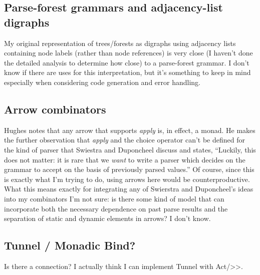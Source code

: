 \documentclass[12pt]{article}
\begin{document}
\subsection{Parse-forest grammars and adjacency-list digraphs}
\label{sec:parse-forest_grammars_adjacency-list_digraphs}

My original representation of trees/forests as digraphs using
adjacency lists containing node labels (rather than node references)
is very close (I haven't done the detailed analysis to determine how
close) to a parse-forest grammar.  I don't know if there are uses for
this interpretation, but it's something to keep in mind especially
when considering code generation and error handling.

\subsection{Arrow combinators}
\label{sec:arrow_combinators}

Hughes notes that any arrow that supports \emph{apply} is, in effect,
a monad.  He makes the further observation that \emph{apply} and the
choice operator can't be defined for the kind of parser that Swiestra
and Duponcheel discuss and states, ``Luckily, this does not matter: it
is rare that we \emph{want} to write a parser which decides on the
grammar to accept on the basis of previously parsed values.''  Of
course, since this is exactly what I'm trying to do, using arrows here
would be counterproductive.  What this means exactly for integrating
any of Swierstra and Duponcheel's ideas into my combinators I'm not
sure: is there some kind of model that can incorporate both the
necessary dependence on past parse results and the separation of
static and dynamic elements in arrows?  I don't know.

\subsection{Tunnel / Monadic Bind?}
\label{sec:tunnel_bind}

Is there a connection?  I actually think I can implement Tunnel with
Act/>>.
\end{document}
